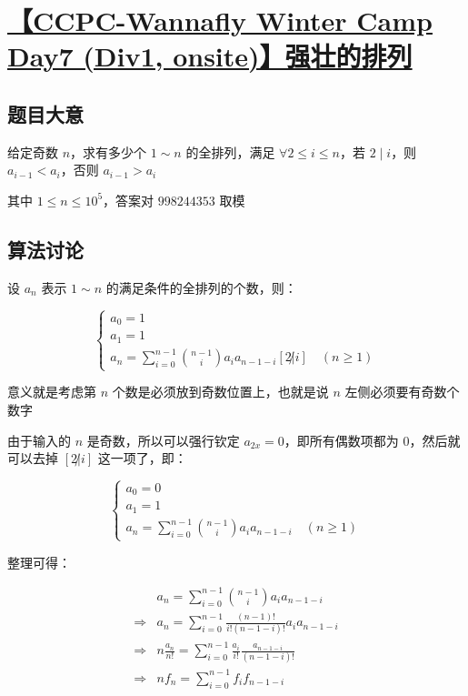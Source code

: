 \documentclass[UTF8]{article}
\begin{document}
\section{\href{https://www.zhixincode.com/contest/24/problem/J?problem_id=358}{【CCPC-Wannafly Winter Camp Day7 (Div1, onsite)】强壮的排列}}

\subsection{题目大意}

给定奇数 $n$，求有多少个 $1 \sim n$ 的全排列，满足 $\forall 2 \le i \le n$，若 $2 \mid i$，则 $a_{i-1} < a_i$，否则 $a_{i-1} > a_i$

其中 $1 \le n \le 10^5$，答案对 $998244353$ 取模

\subsection{算法讨论}

设 $a_n$ 表示 $1 \sim n$ 的满足条件的全排列的个数，则：

$$
\begin{cases}
a_0=1 \\
a_1=1 \\
a_n=\sum_{i=0}^{n-1} {n - 1 \choose i} a_i a_{n-1-i} [2 \not| i] \quad (n \ge 1)
\end{cases}
$$

意义就是考虑第 $n$ 个数是必须放到奇数位置上，也就是说 $n$ 左侧必须要有奇数个数字

由于输入的 $n$ 是奇数，所以可以强行钦定 $a_{2x}=0$，即所有偶数项都为 $0$，然后就可以去掉 $[2 \not| i]$ 这一项了，即：

$$
\begin{cases}
a_0=0 \\
a_1=1 \\
a_n=\sum_{i=0}^{n-1}{n-1 \choose i} a_i a_{n-1-i} \quad (n \ge 1)
\end{cases}
$$

整理可得：

$$
\begin{aligned}
&a_n=\sum_{i=0}^{n-1}{n-1 \choose i} a_i a_{n-1-i} \\
\Rightarrow &a_n=\sum_{i=0}^{n-1}\frac{(n-1)!}{i!(n-1-i)!}a_ia_{n-1-i} \\
\Rightarrow &n\frac{a_n}{n!}=\sum_{i=0}^{n-1}\frac{a_i}{i!}\frac{a_{n-1-i}}{(n-1-i)!} \\
\Rightarrow &nf_n=\sum_{i=0}^{n-1}f_if_{n-1-i}
\end{aligned}
$$
\end{document}
